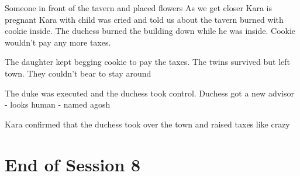 Someone in front of the tavern and placed flowers
As we get closer Kara is pregnant
Kara with child was cried and told us about the tavern burned with cookie inside.
The duchess burned the building down while he was inside. Cookie wouldn't pay any more taxes.

The daughter kept begging cookie to pay the taxes. 
The twins survived but left town. They couldn't bear to stay around


The duke was executed and the duchess took control.
Duchess got a new advisor - looks human - named agosh

Kara confirmed that the duchess took over the town and raised taxes like crazy



	
\section{End of Session 8}
